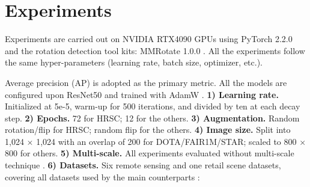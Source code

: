 \section{Experiments}
\label{sec:experiment}

Experiments are carried out on NVIDIA RTX4090 GPUs using PyTorch 2.2.0 \cite{paszke2019pytorch} and the rotation detection tool kits: MMRotate 1.0.0 \cite{zhou2022mmrotate}. All the experiments follow the same hyper-parameters (learning rate, batch size, optimizer, etc.).

Average precision (AP) is adopted as the primary metric. All the models are configured upon ResNet50 \cite{he2016deep} and trained with AdamW \cite{loshchilov2018decoupled}.
\textbf{1) Learning rate.} Initialized at 5e-5, warm-up for 500 iterations, and divided by ten at each decay step. 
\textbf{2) Epochs.} 72 for HRSC; 12 for the others.
\textbf{3) Augmentation.} Random rotation/flip for HRSC; random flip for the others.
\textbf{4) Image size.} Split into 1,024 $\times$ 1,024 with an overlap of 200 for DOTA/FAIR1M/STAR; scaled to 800 $\times$ 800 for others.
\textbf{5) Multi-scale.} All experiments evaluated without multi-scale technique \cite{zhou2022mmrotate}. 
\textbf{6) Datasets.} Six remote sensing and one retail scene datasets, covering all datasets used by the main counterparts \cite{yu2024point2rbox, luo2024pointobb, cao2023p2rbox}:

